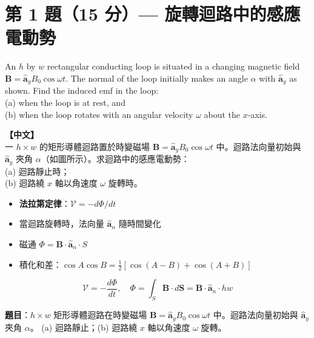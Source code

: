 \documentclass[12pt,a4paper]{article}
\newcommand{\vB}{\mathbf{B}}
\newcommand{\vS}{\mathbf{S}}
\newcommand{\ay}{\hat{\mathbf{a}}_y}
\newcommand{\an}{\hat{\mathbf{a}}_n}
\newcommand{\emf}{\mathcal{V}}
\begin{document}
\section{第 1 題（15 分）— 旋轉迴路中的感應電動勢}

\begin{questionbox}
An $h$ by $w$ rectangular conducting loop is situated in a changing magnetic field $\vB = \ay B_0\cos\omega t$. The normal of the loop initially makes an angle $\alpha$ with $\ay$ as shown. Find the induced emf in the loop:\\
(a) when the loop is at rest, and\\
(b) when the loop rotates with an angular velocity $\omega$ about the $x$-axis.

\medskip\noindent\textbf{【中文】}\\
一 $h \times w$ 的矩形導體迴路置於時變磁場 $\vB = \ay B_0\cos\omega t$ 中。迴路法向量初始與 $\ay$ 夾角 $\alpha$（如圖所示）。求迴路中的感應電動勢：\\
(a) 迴路靜止時；\\
(b) 迴路繞 $x$ 軸以角速度 $\omega$ 旋轉時。
\end{questionbox}

\begin{conceptbox}[核心概念]
\begin{itemize}
  \item \textbf{法拉第定律}：$\emf = -d\Phi/dt$
  \item 當迴路旋轉時，法向量 $\an$ 隨時間變化
  \item 磁通 $\Phi = \vB \cdot \an \cdot S$
  \item 積化和差：$\cos A\cos B = \tfrac{1}{2}[\cos(A-B)+\cos(A+B)]$
\end{itemize}
\end{conceptbox}

\begin{formulabox}[相關公式]
\[
  \emf = -\frac{d\Phi}{dt}, \quad \Phi = \int_S \vB\cdot d\vS = \vB\cdot\an\cdot hw
\]
\end{formulabox}

\textbf{題目}：$h\times w$ 矩形導體迴路在時變磁場 $\vB = \ay B_0\cos\omega t$ 中。迴路法向量初始與 $\ay$ 夾角 $\alpha$。
(a) 迴路靜止；(b) 迴路繞 $x$ 軸以角速度 $\omega$ 旋轉。
\end{document}
